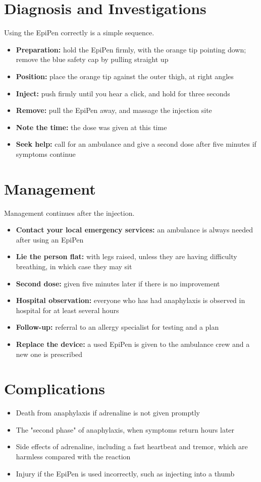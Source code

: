 \section*{Diagnosis and Investigations}
Using the EpiPen correctly is a simple sequence.
\begin{itemize}
    \item \textbf{Preparation:} hold the EpiPen firmly, with the orange tip pointing down; remove the blue safety cap by pulling straight up
    \item \textbf{Position:} place the orange tip against the outer thigh, at right angles
    \item \textbf{Inject:} push firmly until you hear a click, and hold for three seconds
    \item \textbf{Remove:} pull the EpiPen away, and massage the injection site
    \item \textbf{Note the time:} the dose was given at this time
    \item \textbf{Seek help:} call for an ambulance and give a second dose after five minutes if symptoms continue
\end{itemize}

\section*{Management}
Management continues after the injection.
\begin{itemize}
    \item \textbf{Contact your local emergency services:} an ambulance is always needed after using an EpiPen
    \item \textbf{Lie the person flat:} with legs raised, unless they are having difficulty breathing, in which case they may sit
    \item \textbf{Second dose:} given five minutes later if there is no improvement
    \item \textbf{Hospital observation:} everyone who has had anaphylaxis is observed in hospital for at least several hours
    \item \textbf{Follow-up:} referral to an allergy specialist for testing and a plan
    \item \textbf{Replace the device:} a used EpiPen is given to the ambulance crew and a new one is prescribed
\end{itemize}

\section*{Complications}
\begin{itemize}
    \item Death from anaphylaxis if adrenaline is not given promptly
    \item The "second phase" of anaphylaxis, when symptoms return hours later
    \item Side effects of adrenaline, including a fast heartbeat and tremor, which are harmless compared with the reaction
    \item Injury if the EpiPen is used incorrectly, such as injecting into a thumb
\end{itemize}

